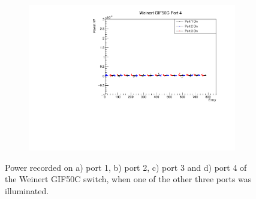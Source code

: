 \documentclass[a4paper,11pt]{article}
\begin{document}
\begin{figure}[h!]
\begin{subfigure}{0.5\textwidth}
\subcaption{}\label{fig:weingifcrosstalkport3}
\end{subfigure}%
\begin{subfigure}{0.5\textwidth}
\includegraphics[width=\linewidth]{WeinertGIF50CPort4.pdf}
\subcaption{}\label{fig:weingifcrosstalkport4}
\end{subfigure}
\caption{Power recorded on a) port 1, b) port 2, c) port 3 and d) port 4 of the Weinert GIF50C switch, when one of the other three ports was illuminated.}\label{fig:weingifcrosstalk2}
\end{figure}
\end{document}
